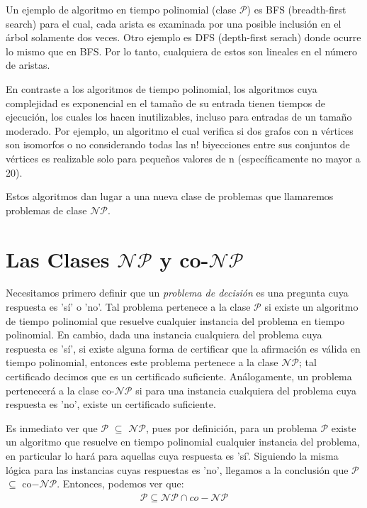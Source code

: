 \documentclass{article}
\begin{document}
Un ejemplo de algoritmo en tiempo polinomial (clase $\mathcal{P}$)
es BFS (breadth-first search) para el cual, cada arista es examinada por una posible
inclusión en el árbol solamente dos veces. Otro ejemplo es DFS (depth-first serach)
donde ocurre lo mismo que en BFS. Por lo tanto, cualquiera de estos son
lineales en el número de aristas.

En contraste a los algoritmos de tiempo polinomial, los
algoritmos cuya complejidad es exponencial en el tamaño de su
entrada tienen tiempos de ejecución, los cuales los hacen inutilizables,
incluso para entradas de un tamaño moderado. Por ejemplo, un algoritmo
el cual verifica si dos grafos con n vértices son isomorfos o no 
considerando todas las n! biyecciones entre sus conjuntos de vértices es
realizable solo para pequeños valores de n (específicamente no mayor a 20).

Estos algoritmos dan lugar a una nueva clase de problemas que llamaremos
problemas de clase $\mathcal{NP}$.

\section*{Las Clases $\mathcal{NP}$ y co-$\mathcal{NP}$}
Necesitamos primero definir que un \textit{problema de decisión}
es una pregunta cuya respuesta es 'sí' o 'no'. Tal problema pertenece
a la clase $\mathcal{P}$ si existe un algoritmo de tiempo
polinomial que resuelve cualquier instancia del problema en tiempo
polinomial. En cambio, dada una instancia
cualquiera del problema cuya respuesta es 'sí', si existe alguna forma de 
certificar que la afirmación es válida en tiempo polinomial, entonces este problema
pertenece a la clase $\mathcal{NP}$; tal certificado decimos
que es un certificado suficiente. Análogamente,
un problema pertenecerá a la clase co-$\mathcal{NP}$ si para
una instancia cualquiera del problema cuya respuesta es 'no', existe un
certificado suficiente.

Es inmediato ver que 
$\mathcal{P}$ $\subseteq$ \textit{$\mathcal{NP}$},
pues por definición, para un problema $\mathcal{P}$ existe
un algoritmo que resuelve en tiempo polinomial cualquier instancia
del problema, en particular lo hará para aquellas cuya respuesta es
'sí'. Siguiendo la misma lógica para las instancias cuyas respuestas
es 'no', llegamos a la conclusión que $\mathcal{P}$
$\subseteq$ co$-\mathcal{NP}$. Entonces, podemos
ver que:
\begin{align*}
    \mathcal{P} \subseteq \mathcal{NP}
    \cap co-\mathcal{NP}
\end{align*}
\end{document}
